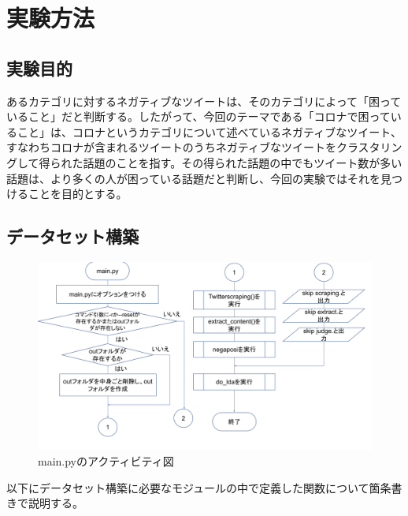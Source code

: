 \documentclass[a4paper, 11pt, titlepage]{jsarticle}
\begin{document}
\section{実験方法}
\subsection{実験目的}
あるカテゴリに対するネガティブなツイートは、そのカテゴリによって「困っていること」だと判断する。したがって、今回のテーマである「コロナで困っていること」は、コロナというカテゴリについて述べているネガティブなツイート、すなわちコロナが含まれるツイートのうちネガティブなツイートをクラスタリングして得られた話題のことを指す。その得られた話題の中でもツイート数が多い話題は、より多くの人が困っている話題だと判断し、今回の実験ではそれを見つけることを目的とする。

\subsection{データセット構築}
\begin{figure}[H]
  \centering 
  \includegraphics[scale=0.25]{main_flowchart.png}
  \caption{main.pyのアクティビティ図}
\end{figure}
以下にデータセット構築に必要なモジュールの中で定義した関数について箇条書きで説明する。
\end{document}
